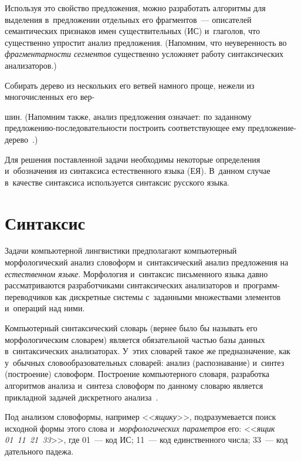 \begin{multicols}{2}
     Используя это свойство предложения, можно разработать алгоритмы для 
выделения в~предложении отдельных его фрагментов~--- описателей семантических 
признаков имен существительных (ИС) и~глаголов, что существенно упростит 
анализ предложения. (Напомним, что не\-уве\-рен\-ность во \textit{фрагментарности 
сегментов} существенно услож\-ня\-ет работу синтаксических анализаторов.) 
     
     Собирать дерево из нескольких его ветвей намного проще, нежели из 
мно\-го\-чис\-лен\-ных его вер-\linebreak\vspace*{-12pt}

\columnbreak

\noindent
шин. (Напомним также, анализ предложения означает: по 
заданному пред\-ло\-же\-нию-по\-сле\-до\-ва\-тель\-ности построить 
со\-от\-вет\-ст\-ву\-ющее ему пред\-ло\-же\-ние-де\-ре\-во~\cite{4-mir}.) 
     
     Для решения поставленной задачи необходимы некоторые определения 
и~обозначения из синтаксиса естественного языка (ЕЯ). В~данном случае в~качестве 
синтаксиса используется синтаксис русского языка.

\vspace*{-6pt}
     
\section{Синтаксис}

     Задачи компьютерной лингвистики предполагают компьютерный 
морфологический анализ словоформ и~синтаксический анализ предложения на 
\textit{естественном языке}. Морфология и~синтаксис письменного языка 
давно рас\-смат\-ри\-ва\-ют\-ся разработчиками синтаксических анализаторов 
и~про\-грамм-пе\-ре\-вод\-чи\-ков как дискретные сис\-те\-мы с~заданными множествами 
элементов и~операций над ними. 
      
     Компьютерный синтаксический словарь (вернее было бы называть его 
морфологическим словарем) является обязательной \mbox{частью} базы данных\linebreak 
в~синтаксических анализаторах. У~этих словарей такое же предназначение, как 
у~обычных словообразовательных словарей: анализ (распознавание) и~синтез 
(построение) словоформ. Построение компьютерного словаря, разработка 
алгоритмов анализа и~синтеза словоформ по данному словарю является 
при\-клад\-ной задачей дискретного анализа~\cite{2-mir}. 
     
     Под анализом словоформы, например <<\textit{ящику}>>, под\-ра\-зу\-ме\-ва\-ет\-ся 
поиск исходной формы этого слова и~\textit{морфологических параметров} его: 
<<\textit{ящик 01~11~21~33}>>, где 01~--- код ИС; 
11~--- код единственного чис\-ла; 33~--- код дательного падежа.
     

\end{multicols}
